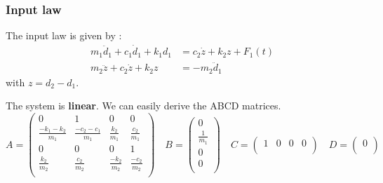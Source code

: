 \documentclass[a4paper, 12pt]{article}
\begin{document}
    \subsubsection{Input law}
    The input law is given by \cite{science_direct} :
    \begin{align*}
        m_{1}\ddot{d}_{1} + c_{1}\dot{d}_{1} + k_{1}d_{1} &= c_{2}\dot{z} + k_{2}z + F_{1}(t)\\
        m_{2}\ddot{z} + c_{2}\dot{z} + k_{2}z &= -m_{2}\ddot{d}_{1}
    \end{align*}
    with $z = d_2 - d_1$.\par
    The system is \textbf{linear}. We can easily derive the ABCD matrices.
    $$
    A = \begin{pmatrix}
        0 & 1 & 0 & 0 \\
        \frac{-k_1-k_2}{m_1} & \frac{-c_2-c_1}{m_1} & \frac{k_2}{m_1} & \frac{c_2}{m_1} \\
        0 & 0 & 0 & 1 \\ 
        \frac{k_2}{m_2} & \frac{c_2}{m_2} & \frac{-k_2}{m_2} & \frac{-c_2}{m_2}\\
    \end{pmatrix}
    \quad
    B = \begin{pmatrix}
        0\\
        \frac{1}{m_1}\\
        0\\
        0\\
    \end{pmatrix}
    \quad
    C = \begin{pmatrix}
        1 & 0 & 0 & 0\\
    \end{pmatrix}
    \quad
    D = \begin{pmatrix}
        0\\
    \end{pmatrix}
    $$
    
\end{document}
